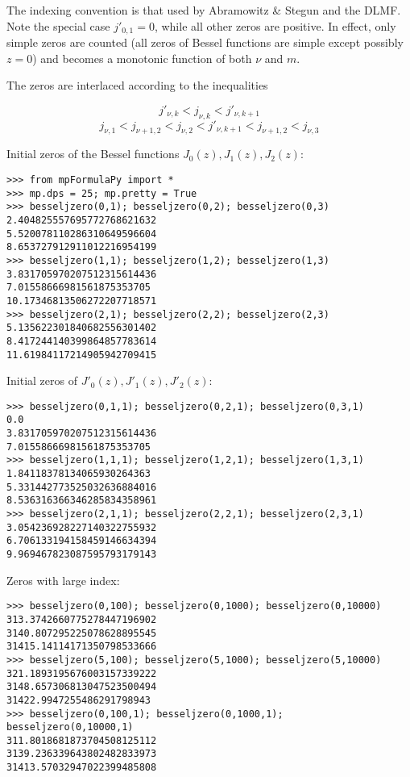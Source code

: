 The indexing convention is that used by Abramowitz \& Stegun and the DLMF. Note the special case $j'_{0,1}=0$, while all other zeros are positive. In effect, only simple zeros are counted (all zeros of Bessel functions are simple except possibly $z=0$) and becomes a monotonic function of both $\nu$ and $m$.

The zeros are interlaced according to the inequalities

\begin{equation}
j'_{\nu,k} < j_{\nu,k} < j'_{\nu,k+1}
\end{equation}
\begin{equation}
j_{\nu,1} < j_{\nu+1,2} < j_{\nu,2} < j'_{\nu,k+1} < j_{\nu+1,2} < j_{\nu,3}
\end{equation}

Initial zeros of the Bessel functions $J_0(z), J_1(z), J_2(z)$:

\begin{lstlisting}
>>> from mpFormulaPy import *
>>> mp.dps = 25; mp.pretty = True
>>> besseljzero(0,1); besseljzero(0,2); besseljzero(0,3)
2.404825557695772768621632
5.520078110286310649596604
8.653727912911012216954199
>>> besseljzero(1,1); besseljzero(1,2); besseljzero(1,3)
3.831705970207512315614436
7.01558666981561875353705
10.17346813506272207718571
>>> besseljzero(2,1); besseljzero(2,2); besseljzero(2,3)
5.135622301840682556301402
8.417244140399864857783614
11.61984117214905942709415
\end{lstlisting}

Initial zeros of $J'_0(z), J'_1(z), J'_2(z)$:

\begin{lstlisting}
>>> besseljzero(0,1,1); besseljzero(0,2,1); besseljzero(0,3,1)
0.0
3.831705970207512315614436
7.01558666981561875353705
>>> besseljzero(1,1,1); besseljzero(1,2,1); besseljzero(1,3,1)
1.84118378134065930264363
5.331442773525032636884016
8.536316366346285834358961
>>> besseljzero(2,1,1); besseljzero(2,2,1); besseljzero(2,3,1)
3.054236928227140322755932
6.706133194158459146634394
9.969467823087595793179143
\end{lstlisting}

Zeros with large index:

\begin{lstlisting}
>>> besseljzero(0,100); besseljzero(0,1000); besseljzero(0,10000)
313.3742660775278447196902
3140.807295225078628895545
31415.14114171350798533666
>>> besseljzero(5,100); besseljzero(5,1000); besseljzero(5,10000)
321.1893195676003157339222
3148.657306813047523500494
31422.9947255486291798943
>>> besseljzero(0,100,1); besseljzero(0,1000,1); besseljzero(0,10000,1)
311.8018681873704508125112
3139.236339643802482833973
31413.57032947022399485808
\end{lstlisting}



